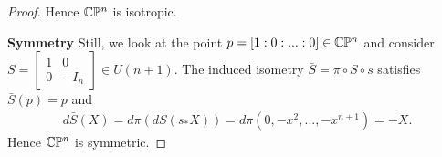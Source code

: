 \documentclass[11pt, a4paper]{article}
\theoremstyle{plain}
\theoremstyle{definition}
\theoremstyle{remark}
\begin{document}
\begin{proof}
    Hence $\mathbb{C}\mathbb{P}^n$ is isotropic.

    \textbf{Symmetry} Still, we look at the point $p = [1:0:...:0] \in \mathbb{C}\mathbb{P}^n$ and consider $S = \left[\begin{matrix}
        1 & 0 \\ 0 & -I_n
    \end{matrix}\right] \in U(n+1)$. The induced isometry $\bar{S} = \pi \circ S \circ s$ satisfies $\bar{S}(p) = p$ and
    \begin{align*}
        d\bar{S}(X) = d\pi(dS(s_*X)) = d\pi(0, -x^2,...,-x^{n+1}) = -X.
    \end{align*}
    Hence $\mathbb{C}\mathbb{P}^n$ is symmetric.
\end{proof}
\end{document}

